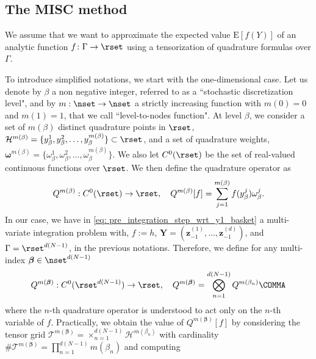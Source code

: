 \subsection{The MISC method} \label{sec:Details of the MISC}

We assume that we want to approximate the expected value $\text{E}[f(Y)]$ of an analytic function $f\colon \Gamma \to \rset$ using a tensorization of quadrature formulas over $\Gamma$.

To introduce simplified notations, we start with the one-dimensional case. Let us denote by $\beta$ a non negative integer, referred to as a ``stochastic discretization level", and by $m: \nset \rightarrow \nset$  a strictly increasing function with $m(0)=0$ and $m(1)=1$, that we call  ``level-to-nodes function". At level $\beta$, we consider a set of $m(\beta)$ distinct quadrature points in $\rset$, $\mathcal{H}^{m(\beta)}=\{y^1_\beta,y^2_\beta,\dots,y_\beta^{m(\beta)}\} \subset \rset$, and a set of quadrature weights, $\boldsymbol{\omega}^{m(\beta)}=\{\omega^1_\beta,\omega^2_\beta,\dots,\omega_\beta^{m(\beta)}\}$. We also let $C^0(\rset)$ be the set of real-valued continuous functions over $\rset$. We then define the quadrature operator as
\begin{equation*}
Q^{m(\beta)}:C^0(\rset) \rightarrow \rset, \quad Q^{m(\beta)}[f]= \sum_{j=1}^{m(\beta)} f(y^j_\beta) \omega_\beta^j.
\end{equation*}
In our case, we have in \eqref{eq: pre_integration_step_wrt_y1_basket} a multi-variate integration problem with, $f:=h$, $\mathbf{Y}=(\mathbf{z}^{(1)}_{-1},\dots,\mathbf{z}^{(d)}_{-1})$,  and  $\Gamma=\rset^{d (N-1)}$, in the previous notations.  Therefore,  we define for any multi-index $\boldsymbol{\beta} \in \nset^{d (N-1)}$
$$Q^{m(\boldsymbol{\beta})}: C^0(\rset^{d (N-1)}) \rightarrow \rset,\quad  Q^{m(\boldsymbol{\beta})}= \bigotimes_{n = 1}^{d (N-1)} Q^{m(\beta_n)} \COMMA $$
where the $n$-th quadrature operator is understood to act only on the $n$-th variable of $f$. Practically, we obtain the value of $Q^{m(\boldsymbol{\beta})}[f]$  by considering the tensor grid $\mathcal{T}^{m(\boldsymbol{\beta})}= \times_{n = 1}^{d (N-1)}  \mathcal{H}^{m(\beta_n)}$ with cardinality $\#\mathcal{T}^{m(\boldsymbol{\beta})}=\prod_{n=1}^{d (N-1)} m (\beta_n)$ and computing

